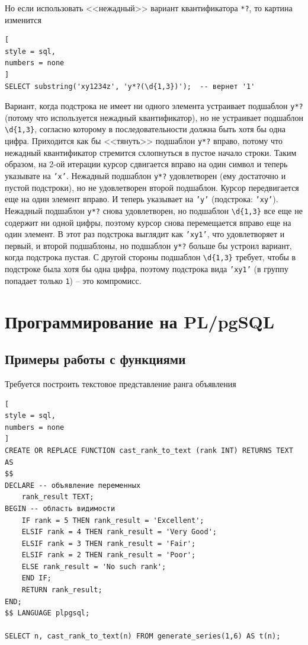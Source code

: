 \documentclass[%
	11pt,
	a4paper,
	utf8,
		]{article}
\begin{document}
Но если использовать <<нежадный>> вариант квантификатора \texttt{*?}, то картина изменится
\begin{lstlisting}[
style = sql,
numbers = none
]
SELECT substring('xy1234z', 'y*?(\d{1,3})');  -- вернет '1'
\end{lstlisting}

Вариант, когда подстрока не имеет ни одного элемента устраивает подшаблон \texttt{y*?} (потому что используется нежадный квантификатор), но не устраивает подшаблон \verb|\d{1,3}|, согласно которому в последовательности должна быть хотя бы одна цифра. Приходится как бы <<тянуть>> подшаблон \texttt{y*?} вправо, потому что нежадный квантификатор стремится схлопнуться в пустое начало строки. Таким образом, на 2-ой итерации курсор сдвигается вправо на один символ и теперь указывате на \texttt{'x'}. Нежадный подшаблон \texttt{y*?} удовлетворен (ему достаточно и пустой подстроки), но не удовлетворен второй подшаблон. Курсор передвигается еще на один элемент вправо. И теперь указывает на \texttt{'y'} (подстрока: \texttt{'xy'}). Нежадный подшаблон \texttt{y*?} снова удовлетворен, но подшаблон \verb|\d{1,3}| все еще не содержит ни одной цифры, поэтому курсор снова перемещается вправо еще на один элемент. В этот раз подстрока выглядит как \texttt{'xy1'}, что удовлетворяет и первый, и второй подшаблоны, но подшаблон \texttt{y*?} больше бы устроил вариант, когда подстрока пустая. С другой стороны подшаблон \verb|\d{1,3}| требует, чтобы в подстроке была хотя бы одна цифра, поэтому подстрока вида \texttt{'xy1'} (в группу попадает только \texttt{1}) -- это компромисс.


\section{Программирование на PL/pgSQL}

\subsection{Примеры работы с функциями}

Требуется построить текстовое представление ранга объявления
\begin{lstlisting}[
style = sql,
numbers = none
]
CREATE OR REPLACE FUNCTION cast_rank_to_text (rank INT) RETURNS TEXT AS
$$
DECLARE -- объявление переменных
    rank_result TEXT;
BEGIN -- область видимости
    IF rank = 5 THEN rank_result = 'Excellent';
    ELSIF rank = 4 THEN rank_result = 'Very Good';
    ELSIF rank = 3 THEN rank_result = 'Fair';
    ELSIF rank = 2 THEN rank_result = 'Poor';
    ELSE rank_result = 'No such rank';
    END IF;
    RETURN rank_result;
END;
$$ LANGUAGE plpgsql;

SELECT n, cast_rank_to_text(n) FROM generate_series(1,6) AS t(n);
\end{lstlisting}
\end{document}
